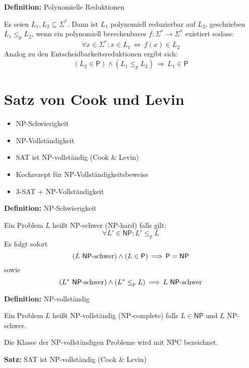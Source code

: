 \documentclass[a4paper,graphics,11pt]{article}
\newcommand{\Iff}[0]{\,\Longleftrightarrow\,}
\begin{document}
\strut

\textbf{Definition:} Polynomielle Reduktionen

Es seien $L_1,L_2 \subseteq \Sigma^*$. Dann ist $L_1$ polynomiell reduzierbar auf $L_2$, geschrieben $L_1 \leq_p L_2$,
wenn ein polynomiell berechenbares $f : \Sigma^* \to \Sigma^*$ existiert sodass:
$$
    \forall x \in \Sigma^* : x \in L_1 \Iff f(x) \in L_2
$$
Analog zu den Entscheidbarkeitsreduktionen ergibt sich:
$$
    (L_2 \in \textsf{P}) \land (L_1 \leq_p L_2) \,\Longrightarrow\, L_1 \in \textsf{P}
$$



\newpage



\section{Satz von Cook und Levin}

\begin{itemize}
    \item \textsf{NP}-Schwierigkeit
    \item \textsf{NP}-Vollständigkeit
    \item SAT ist \textsf{NP}-vollständig (Cook \& Levin)
    \item Kochrezept für \textsf{NP}-Vollständigkeitsbeweise
    \item 3-SAT + \textsf{NP}-Vollständigkeit
\end{itemize}

\textbf{Definition:} \textsf{NP}-Schwierigkeit

Ein Problem $L$ heißt \textsf{NP}-schwer (\textsf{NP}-hard) falls gilt:
$$
    \forall L' \in \textsf{NP} : L' \leq_p L
$$
Es folgt sofort
$$
    (L \text{ \textsf{NP}-schwer}) \land (L \in \textsf{P}) \,\Longrightarrow\, \textsf{P} = \textsf{NP}
$$
sowie
$$
    (L^* \text{ \textsf{NP}-schwer}) \land (L^* \leq_p L) \,\Longrightarrow\, L \text{ \textsf{NP}-schwer}
$$

\strut

\textbf{Definition:} \textsf{NP}-vollständig

Ein Problem $L$ heißt \textsf{NP}-vollständig (\textsf{NP}-complete) falls $L \in \textsf{NP}$ und $L$ 
\textsf{NP}-schwer.

Die Klasse der \textsf{NP}-vollständigen Probleme wird mit \textsf{NPC} bezeichnet.

\strut

\textbf{Satz:} SAT ist \textsf{NP}-vollständig (Cook \& Levin)
\end{document}
